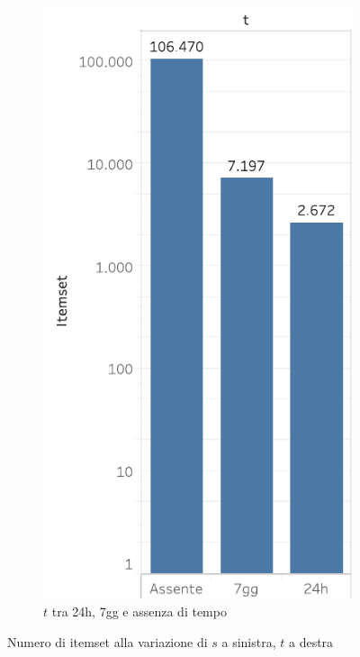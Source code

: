 \begin{figure}
\begin{subfigure}{.5\textwidth}
   \includegraphics[scale=0.5]{res/fig/sec-4/itemset/ItemsetT.pdf}
   \caption{\(t\) tra 24h, 7gg e assenza di tempo}
  \label{fig:chap-4:ItemsetT}
\end{subfigure}%
  \caption{Numero di itemset alla variazione di \(s\) a sinistra, \(t\) a destra}%
  \label{fig:chap-4:ItemsetSandT}
\end{figure}

